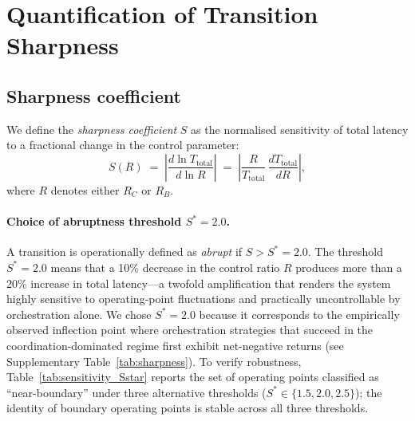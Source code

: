 
\section{Quantification of Transition Sharpness}
\label{app:sharpness}

\subsection{Sharpness coefficient}

We define the \emph{sharpness coefficient} $S$ as the normalised sensitivity
of total latency to a fractional change in the control parameter:
\begin{equation}
S(R) \;=\; \left|\frac{d\ln T_{\mathrm{total}}}{d\ln R}\right|
       \;=\; \left|\frac{R}{T_{\mathrm{total}}}\,
              \frac{dT_{\mathrm{total}}}{dR}\right|,
\label{eq:sharpness}
\end{equation}
where $R$ denotes either $R_C$ or $R_B$.

\paragraph{Choice of abruptness threshold $S^* = 2.0$.}
A transition is operationally defined as \emph{abrupt} if $S > S^* = 2.0$.
The threshold $S^* = 2.0$ means that a 10\% decrease in the control ratio
$R$ produces more than a 20\% increase in total latency---a twofold
amplification that renders the system highly sensitive to operating-point
fluctuations and practically uncontrollable by orchestration alone.
We chose $S^* = 2.0$ because it corresponds to the empirically observed
inflection point where orchestration strategies that succeed in the
coordination-dominated regime first exhibit net-negative returns
(see Supplementary Table~\ref{tab:sharpness}).
To verify robustness, Table~\ref{tab:sensitivity_Sstar} reports the set of
operating points classified as ``near-boundary'' under three alternative
thresholds ($S^* \in \{1.5, 2.0, 2.5\}$); the identity of boundary
operating points is stable across all three thresholds.

